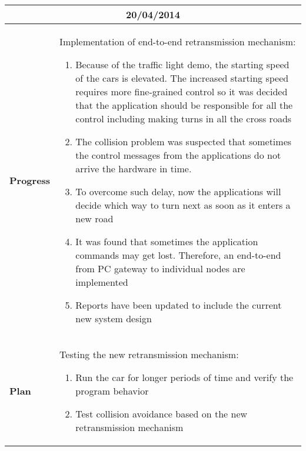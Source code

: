 \begin{center}
\begin{longtable}{ | p{2cm} | p{10cm} | }
                \multicolumn{2}{|c|}{\textbf{20/04/2014}} \\ \hline
                \textbf{Progress} & Implementation of end-to-end retransmission mechanism:
                \begin{enumerate}
                  \item Because of the traffic light demo, the starting speed of the cars is elevated. The increased starting speed requires more fine-grained control so it was decided that the application should be responsible for all the control including making turns in all the cross roads
                  \item The collision problem was suspected that sometimes the control messages from the applications do not arrive the hardware in time.
                  \item To overcome such delay, now the applications will decide which way to turn next as soon as it enters a new road
                  \item It was found that sometimes the application commands may get lost. Therefore, an end-to-end from PC gateway to individual nodes are implemented
                  \item Reports have been updated to include the current new system design
                \end{enumerate} \\ \hline
                \textbf{Plan} & Testing the new retransmission mechanism:
                \begin{enumerate}
                  \item Run the car for longer periods of time and verify the program behavior
                  \item Test collision avoidance based on the new retransmission mechanism
                \end{enumerate} \\ \hline
	\end{longtable}
\end{center}
